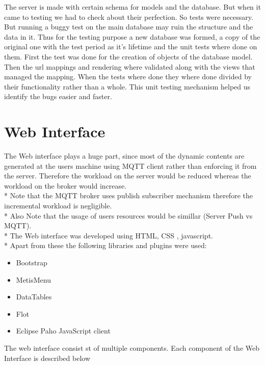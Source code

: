 \documentclass{report}
\begin{document}
    The server is made with certain schema for models and the database. But when it came to testing we had to check about their perfection. So tests were necessary. But running a buggy test on the main database may ruin the structure and the data in it. Thus for the testing purpose a new database was formed, a copy of the original one with the test period as it's lifetime and the unit tests where done on them. First the test was done for the creation of objects of the database model. Then the url mappings and rendering where validated along with the views that managed the mapping. When the tests where done they where done divided by their functionality rather than a whole. This unit testing mechanism helped us identify the bugs easier and faster. 


\section{Web Interface}

The Web interface plays a huge part, since most of the dynamic contents are generated at the users machine using MQTT client rather than enforcing it from the server. Therefore the workload on the server would be reduced whereas the workload on the broker would increase.\\*
Note that the MQTT broker uses publish subscriber mechanism therefore the incremental workload is negligible.\\*
Also Note that the usage of users resources would be simillar (Server Push vs MQTT).\\*
The Web interface was developed using HTML, CSS , javascript.\\*
Apart from these the following libraries and plugins were used:
\begin{itemize}
    \item Bootstrap
    \item MetisMenu
    \item DataTables
    \item Flot
    \item Eclipse Paho JavaScript client
\end{itemize}

The web interface consist st of multiple components. Each component of the Web Interface is described below
\end{document}
